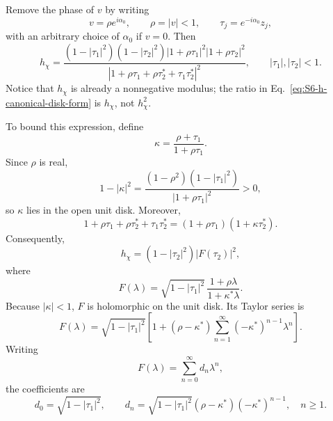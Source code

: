 \documentclass[11pt,a4paper]{article}
\begin{document}
Remove the phase of \(v\) by writing
\begin{equation}
v=\rho e^{i\alpha_0},
\qquad
\rho=|v|<1,
\qquad
\tau_j=e^{-i\alpha_0}z_j ,
\label{eq:S6-phase-rotation}
\end{equation}
with an arbitrary choice of \(\alpha_0\) if \(v=0\). Then
\begin{equation}
h_\chi
=
\frac{
(1-|\tau_1|^2)(1-|\tau_2|^2)
|1+\rho\tau_1|^2
|1+\rho\tau_2|^2
}{
\left|
1+\rho\tau_1+\rho\tau_2^*
+\tau_1\tau_2^*
\right|^2
},
\qquad
|\tau_1|,|\tau_2|<1 .
\label{eq:S6-h-canonical-disk-form}
\end{equation}
Notice that \(h_\chi\) is already a nonnegative modulus; the ratio in
Eq.~\eqref{eq:S6-h-canonical-disk-form} is \(h_\chi\), not \(h_\chi^2\).

To bound this expression, define
\begin{equation}
\kappa
=
\frac{
\rho+\tau_1
}{
1+\rho\tau_1
}.
\label{eq:S6-CS-kappa}
\end{equation}
Since \(\rho\) is real,
\begin{equation}
1-|\kappa|^2
=
\frac{
(1-\rho^2)(1-|\tau_1|^2)
}{
|1+\rho\tau_1|^2
}
>0,
\label{eq:S6-CS-kappa-disk}
\end{equation}
so \(\kappa\) lies in the open unit disk. Moreover,
\begin{equation}
1+\rho\tau_1+\rho\tau_2^*
+\tau_1\tau_2^*
=
(1+\rho\tau_1)
(1+\kappa\tau_2^*).
\label{eq:S6-CS-factorization}
\end{equation}
Consequently,
\begin{equation}
h_\chi
=
(1-|\tau_2|^2)
\left|F(\tau_2)\right|^2,
\label{eq:S6-CS-h-F}
\end{equation}
where
\begin{equation}
F(\lambda)
=
\sqrt{1-|\tau_1|^2}\,
\frac{
1+\rho\lambda
}{
1+\kappa^*\lambda
}.
\label{eq:S6-CS-function}
\end{equation}
Because \(|\kappa|<1\), \(F\) is holomorphic on the unit disk. Its Taylor
series is
\begin{equation}
F(\lambda)
=
\sqrt{1-|\tau_1|^2}
\left[
1+
(\rho-\kappa^*)
\sum_{n=1}^{\infty}
(-\kappa^*)^{n-1}\lambda^n
\right].
\label{eq:S6-CS-series}
\end{equation}
Writing
\begin{equation}
F(\lambda)=\sum_{n=0}^{\infty}d_n\lambda^n,
\end{equation}
the coefficients are
\begin{equation}
d_0
=
\sqrt{1-|\tau_1|^2},
\qquad
d_n
=
\sqrt{1-|\tau_1|^2}
(\rho-\kappa^*)
(-\kappa^*)^{n-1},
\quad n\geq1 .
\label{eq:S6-CS-coefficients}
\end{equation}
\end{document}
